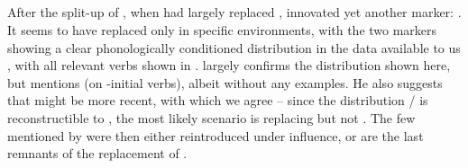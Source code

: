\subsection{\akuriyo {}}
\label{sec:akuriyo}
After the split-up of \PTir, when  had largely replaced , \akuriyo innovated yet another  marker: .
It seems to have replaced  only in specific environments, with the two markers showing a clear phonologically conditioned distribution in the \akuriyo data available to us \parencite{gildea1994akuriyo}, with all relevant verbs shown in .
\textcite[107]{meira1998proto} largely confirms the distribution shown here, but mentions  (on -initial verbs), albeit without any examples.
He also suggests that  might be more recent, with which we agree -- since the distribution  /  is reconstructible to \PTir, the most likely scenario is  replacing  but not .
The few  mentioned by \textcite{meira1998proto} were then either reintroduced under \trio influence, or are the last remnants of the replacement of .




